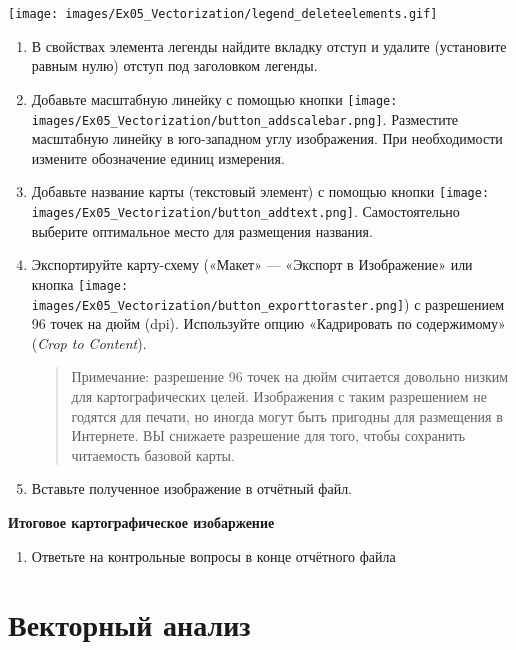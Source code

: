 \documentclass[
  12pt,
]{book}
\providecommand{\tightlist}{%
  \setlength{\itemsep}{0pt}\setlength{\parskip}{0pt}}
\begin{document}
\texttt{[image: images/Ex05\_Vectorization/legend\_deleteelements.gif]}

\begin{enumerate}
\def\labelenumi{\arabic{enumi}.}
\setcounter{enumi}{9}
\item
  В свойствах элемента легенды найдите вкладку отступ и удалите (установите равным нулю) отступ под заголовком легенды.
\item
  Добавьте масштабную линейку с помощью кнопки \texttt{[image: images/Ex05\_Vectorization/button\_addscalebar.png]}. Разместите масштабную линейку в юго-западном углу изображения. При необходимости измените обозначение единиц измерения.
\item
  Добавьте название карты (текстовый элемент) с помощью кнопки \texttt{[image: images/Ex05\_Vectorization/button\_addtext.png]}. Самостоятельно выберите оптимальное место для размещения названия.
\item
  Экспортируйте карту-схему («Макет» --- «Экспорт в Изображение» или кнопка \texttt{[image: images/Ex05\_Vectorization/button\_exporttoraster.png]}) с разрешением 96 точек на дюйм (dpi). Используйте опцию «Кадрировать по содержимому» (\emph{Crop to Content}).

  \begin{quote}
  Примечание: разрешение 96 точек на дюйм считается довольно низким для картографических целей. Изображения с таким разрешением не годятся для печати, но иногда могут быть пригодны для размещения в Интернете. ВЫ снижаете разрешение для того, чтобы сохранить читаемость базовой карты.
  \end{quote}
\item
  Вставьте полученное изображение в отчётный файл.
\end{enumerate}

\textbf{Итоговое картографическое изобаржение}

\begin{enumerate}
\def\labelenumi{\arabic{enumi}.}
\setcounter{enumi}{13}
\tightlist
\item
  Ответьте на контрольные вопросы в конце отчётного файла
\end{enumerate}

\hypertarget{part-ux432ux435ux43aux442ux43eux440ux43dux44bux439-ux430ux43dux430ux43bux438ux437}{%
\part{Векторный анализ}\label{part-ux432ux435ux43aux442ux43eux440ux43dux44bux439-ux430ux43dux430ux43bux438ux437}}
\end{document}
